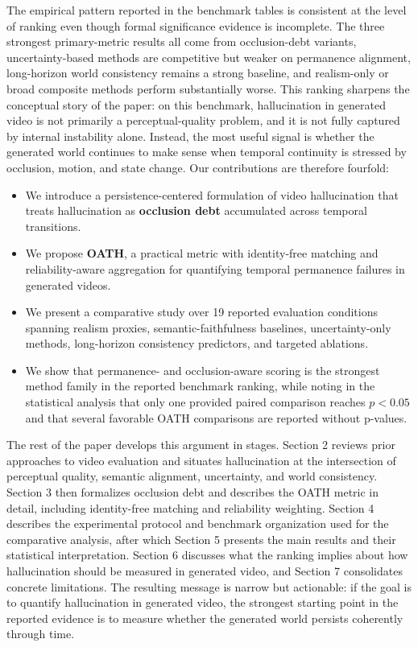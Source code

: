 \documentclass{article}
\begin{document}
The empirical pattern reported in the benchmark tables is consistent at the level of ranking even though formal significance evidence is incomplete. The three strongest primary-metric results all come from occlusion-debt variants, uncertainty-based methods are competitive but weaker on permanence alignment, long-horizon world consistency remains a strong baseline, and realism-only or broad composite methods perform substantially worse. This ranking sharpens the conceptual story of the paper: on this benchmark, hallucination in generated video is not primarily a perceptual-quality problem, and it is not fully captured by internal instability alone. Instead, the most useful signal is whether the generated world continues to make sense when temporal continuity is stressed by occlusion, motion, and state change. Our contributions are therefore fourfold:
\begin{itemize}
    \item We introduce a persistence-centered formulation of video hallucination that treats hallucination as \textbf{occlusion debt} accumulated across temporal transitions.
    \item We propose \textbf{OATH}, a practical metric with identity-free matching and reliability-aware aggregation for quantifying temporal permanence failures in generated videos.
    \item We present a comparative study over 19 reported evaluation conditions spanning realism proxies, semantic-faithfulness baselines, uncertainty-only methods, long-horizon consistency predictors, and targeted ablations.
    \item We show that permanence- and occlusion-aware scoring is the strongest method family in the reported benchmark ranking, while noting in the statistical analysis that only one provided paired comparison reaches \(p<0.05\) and that several favorable OATH comparisons are reported without p-values.
\end{itemize}

The rest of the paper develops this argument in stages. Section 2 reviews prior approaches to video evaluation and situates hallucination at the intersection of perceptual quality, semantic alignment, uncertainty, and world consistency. Section 3 then formalizes occlusion debt and describes the OATH metric in detail, including identity-free matching and reliability weighting. Section 4 describes the experimental protocol and benchmark organization used for the comparative analysis, after which Section 5 presents the main results and their statistical interpretation. Section 6 discusses what the ranking implies about how hallucination should be measured in generated video, and Section 7 consolidates concrete limitations. The resulting message is narrow but actionable: if the goal is to quantify hallucination in generated video, the strongest starting point in the reported evidence is to measure whether the generated world persists coherently through time.
\end{document}
